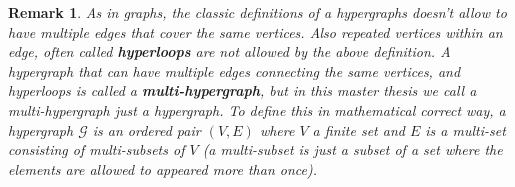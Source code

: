 \documentclass[a4paper,11pt]{report}
\newtheorem{remark}[theorem]{Remark}
\newcommand{\hgraf}{\mathcal{G}}
\begin{document}
\begin{remark}
  As in graphs, the classic definitions of a hypergraphs doesn't allow to have 
  multiple edges that cover the same vertices. Also repeated vertices within an edge, often called \textbf{hyperloops} are not allowed 
  by the above definition. A hypergraph that can have multiple edges connecting 
  the same vertices, and hyperloops is called a \textbf{multi-hypergraph}, but 
  in this master thesis we call a multi-hypergraph just a hypergraph. To define 
  this in mathematical correct way, a hypergraph $\hgraf$ is an ordered
 pair $(V,E)$ where $V$ a finite set and $E$ is a multi-set consisting of 
multi-subsets of $V$ (a multi-subset is just a subset of a set where the elements are 
allowed to appeared more than once).
\end{remark}
\end{document}
